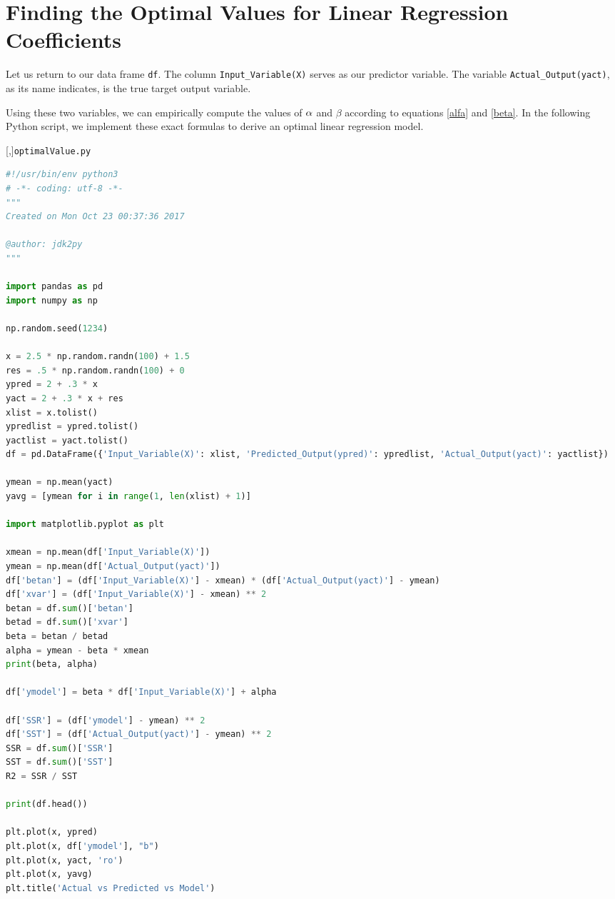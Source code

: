 \section{Finding the Optimal Values for Linear Regression Coefficients}

Let us return to our data frame \texttt{df}. The column \texttt{Input\_Variable(X)} serves as our predictor variable.
The variable \texttt{Actual\_Output(yact)}, as its name indicates, is the true target output variable.

Using these two variables, we can empirically compute the values of $\alpha$ and $\beta$ according to equations \eqref{alfa} and \eqref{beta}. In the following Python script, we implement these exact formulas to derive an optimal linear regression model.

[,]{\texttt{optimalValue.py}}
\begin{lstlisting}[language=Python]
#!/usr/bin/env python3
# -*- coding: utf-8 -*-
"""
Created on Mon Oct 23 00:37:36 2017

@author: jdk2py
"""

import pandas as pd
import numpy as np

np.random.seed(1234)

x = 2.5 * np.random.randn(100) + 1.5
res = .5 * np.random.randn(100) + 0
ypred = 2 + .3 * x
yact = 2 + .3 * x + res
xlist = x.tolist()
ypredlist = ypred.tolist()
yactlist = yact.tolist()
df = pd.DataFrame({'Input_Variable(X)': xlist, 'Predicted_Output(ypred)': ypredlist, 'Actual_Output(yact)': yactlist})

ymean = np.mean(yact)
yavg = [ymean for i in range(1, len(xlist) + 1)]

import matplotlib.pyplot as plt

xmean = np.mean(df['Input_Variable(X)'])
ymean = np.mean(df['Actual_Output(yact)'])
df['betan'] = (df['Input_Variable(X)'] - xmean) * (df['Actual_Output(yact)'] - ymean)
df['xvar'] = (df['Input_Variable(X)'] - xmean) ** 2
betan = df.sum()['betan']
betad = df.sum()['xvar']
beta = betan / betad
alpha = ymean - beta * xmean
print(beta, alpha)

df['ymodel'] = beta * df['Input_Variable(X)'] + alpha

df['SSR'] = (df['ymodel'] - ymean) ** 2
df['SST'] = (df['Actual_Output(yact)'] - ymean) ** 2
SSR = df.sum()['SSR']
SST = df.sum()['SST']
R2 = SSR / SST

print(df.head())

plt.plot(x, ypred)
plt.plot(x, df['ymodel'], "b")
plt.plot(x, yact, 'ro')
plt.plot(x, yavg)
plt.title('Actual vs Predicted vs Model')
\end{lstlisting}

